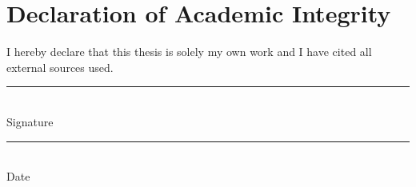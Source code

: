 \documentclass[thesis.tex]{subfiles}
\newcommand{\doublesignature}[3]{%
  \parbox{\textwidth}{
    \parbox{7cm}{
      \rule{6cm}{1pt}\\
       #1 
    }
    \hfill
    \parbox{7cm}{
      \rule{6cm}{1pt}\\
      #2
    }
  }
}
\begin{document}
\chapter*{Declaration of Academic Integrity}
I hereby declare that this thesis is solely my own work and I have cited all external
sources used.


\vspace{100pt}

\doublesignature{Signature}{Date}

\newpage
\end{document}
